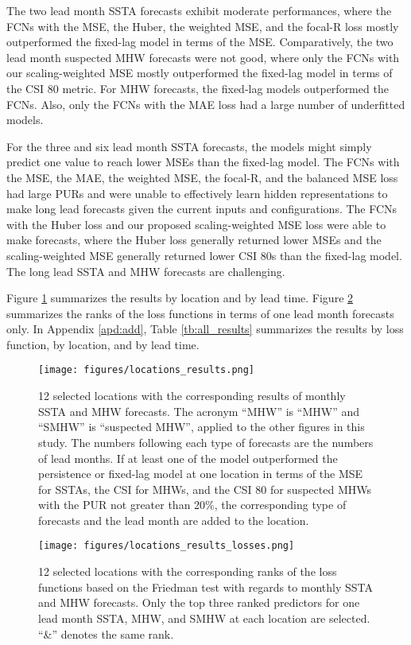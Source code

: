 \documentclass[11pt, a4paper]{article}
\begin{document}
The two lead month SSTA forecasts exhibit moderate performances, where the FCNs with the MSE, the Huber, the weighted MSE, and the focal-R loss mostly outperformed the fixed-lag model in terms of the MSE. Comparatively, the two lead month suspected MHW forecasts were not good, where only the FCNs with our scaling-weighted MSE mostly outperformed the fixed-lag model in terms of the CSI 80 metric. For MHW forecasts, the fixed-lag models outperformed the FCNs. Also, only the FCNs with the MAE loss had a large number of underfitted models.

For the three and six lead month SSTA forecasts, the models might simply predict one value to reach lower MSEs than the fixed-lag model. The FCNs with the MSE, the MAE, the weighted MSE, the focal-R, and the balanced MSE loss had large PURs and were unable to effectively learn hidden representations to make long lead forecasts given the current inputs and configurations. The FCNs with the Huber loss and our proposed scaling-weighted MSE loss were able to make forecasts, where the Huber loss generally returned lower MSEs and the scaling-weighted MSE generally returned lower CSI 80s than the fixed-lag model. The long lead SSTA and MHW forecasts are challenging.

Figure \ref{fg:locs_results} summarizes the results by location and by lead time. Figure \ref{fg:locs_results_losses} summarizes the ranks of the loss functions in terms of one lead month forecasts only. In Appendix \ref{apd:add}, Table \ref{tb:all_results} summarizes the results by loss function, by location, and by lead time.

\begin{figure}[H]
\centering
\texttt{[image: figures/locations\_results.png]}
\caption{12 selected locations with the corresponding results of monthly SSTA and MHW forecasts. The acronym ``MHW'' is ``MHW'' and ``SMHW'' is ``suspected MHW'', applied to the other figures in this study. The numbers following each type of forecasts are the numbers of lead months. If at least one of the model outperformed the persistence or fixed-lag model at one location in terms of the MSE for SSTAs, the CSI for MHWs, and the CSI 80 for suspected MHWs with the PUR not greater than 20\%, the corresponding type of forecasts and the lead month are added to the location.}\label{fg:locs_results}
\end{figure}

\begin{figure}[H]
\centering
\texttt{[image: figures/locations\_results\_losses.png]}
\caption{12 selected locations with the corresponding ranks of the loss functions based on the Friedman test with regards to monthly SSTA and MHW forecasts. Only the top three ranked predictors for one lead month SSTA, MHW, and SMHW at each location are selected. ``\&'' denotes the same rank.}\label{fg:locs_results_losses}
\end{figure}
\end{document}
